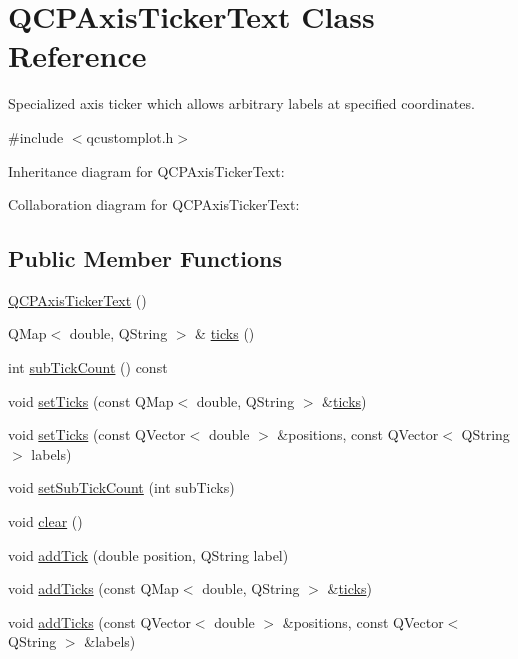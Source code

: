 \hypertarget{class_q_c_p_axis_ticker_text}{}\section{Q\+C\+P\+Axis\+Ticker\+Text Class Reference}
\label{class_q_c_p_axis_ticker_text}


Specialized axis ticker which allows arbitrary labels at specified coordinates.  




{\ttfamily \#include $<$qcustomplot.\+h$>$}



Inheritance diagram for Q\+C\+P\+Axis\+Ticker\+Text\+:


Collaboration diagram for Q\+C\+P\+Axis\+Ticker\+Text\+:
\subsection*{Public Member Functions}
\begin{DoxyCompactItemize}
\item 
\hyperlink{class_q_c_p_axis_ticker_text_a1d7243b1256c1aa9d1d5b99b2e84e648}{Q\+C\+P\+Axis\+Ticker\+Text} ()
\item 
Q\+Map$<$ double, Q\+String $>$ \& \hyperlink{class_q_c_p_axis_ticker_text_ac84622a6bb4f2a98474e185ecaf3189a}{ticks} ()
\item 
int \hyperlink{class_q_c_p_axis_ticker_text_a5c3c59e8fdf4c96568dd50d4a653e791}{sub\+Tick\+Count} () const
\item 
void \hyperlink{class_q_c_p_axis_ticker_text_a8cdf1f21940f1f53f5e3d30b2c74f5cf}{set\+Ticks} (const Q\+Map$<$ double, Q\+String $>$ \&\hyperlink{class_q_c_p_axis_ticker_text_ac84622a6bb4f2a98474e185ecaf3189a}{ticks})
\item 
void \hyperlink{class_q_c_p_axis_ticker_text_a69f3898cc1cf11d2437851f959faa1e8}{set\+Ticks} (const Q\+Vector$<$ double $>$ \&positions, const Q\+Vector$<$ Q\+String $>$ labels)
\item 
void \hyperlink{class_q_c_p_axis_ticker_text_a8cfa50c51183c90186892eeef978d571}{set\+Sub\+Tick\+Count} (int sub\+Ticks)
\item 
void \hyperlink{class_q_c_p_axis_ticker_text_a21826d2fcd9a25c194d34d4f67aa1460}{clear} ()
\item 
void \hyperlink{class_q_c_p_axis_ticker_text_aada3db69e5fc6585aaa4ea5d89552eb0}{add\+Tick} (double position, Q\+String label)
\item 
void \hyperlink{class_q_c_p_axis_ticker_text_aba34051300eecaefbedb2df8feff2d45}{add\+Ticks} (const Q\+Map$<$ double, Q\+String $>$ \&\hyperlink{class_q_c_p_axis_ticker_text_ac84622a6bb4f2a98474e185ecaf3189a}{ticks})
\item 
void \hyperlink{class_q_c_p_axis_ticker_text_a8140c730e20b0050e1b702af3db00b2e}{add\+Ticks} (const Q\+Vector$<$ double $>$ \&positions, const Q\+Vector$<$ Q\+String $>$ \&labels)
\end{DoxyCompactItemize}

